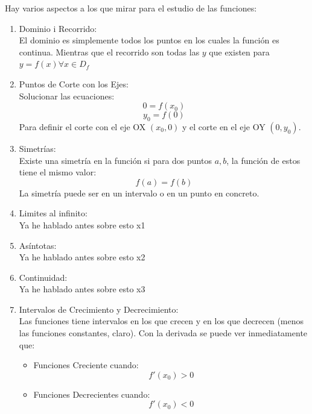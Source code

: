 \documentclass[arial,a4paper,print]{article}
\begin{document}
Hay varios aspectos a los que mirar para el estudio de las funciones:
\begin{enumerate}

\item Dominio i Recorrido:\\
El dominio es simplemente todos los puntos en los cuales la función es continua. Mientras que el recorrido son todas las $y$ que existen para $y = f(x) \forall x\in D_{f}$

\item Puntos de Corte con los Ejes:\\
Solucionar las ecuaciones:
\begin{equation*}
	0 = f(x_{0})
\end{equation*}
\begin{equation*}
	y_{0} = f(0)
\end{equation*}
Para definir el corte con el eje OX $(x_{0}, 0)$ y el corte en el eje OY $(0, y_{0})$. 

\item Simetrías: \\
Existe una simetría en la función si para dos puntos $a, b$, la función de estos tiene el mismo valor:
\begin{equation*}
	f(a) = f(b)
\end{equation*}
La simetría puede ser en un intervalo o en un punto en concreto. 

\item Limites al infinito: \\
Ya he hablado antes sobre esto x1

\item Asíntotas:\\
Ya he hablado antes sobre esto x2

\item Continuidad:\\
Ya he hablado antes sobre esto x3

\item Intervalos de Crecimiento y Decrecimiento:\\
Las funciones tiene intervalos en los que crecen y en los que decrecen (menos las funciones constantes, claro). Con la derivada se puede ver inmediatamente que:
\begin{itemize}
\item Funciones Creciente cuando:
\begin{equation*}
	f'(x_{0}) > 0
\end{equation*}

\item Funciones Decrecientes cuando:
\begin{equation*}
	f'(x_{0}) < 0
\end{equation*}


\end{itemize}
\end{enumerate}
\end{document}
